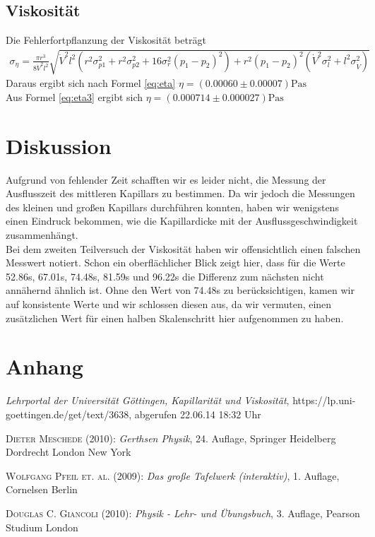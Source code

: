 \documentclass[12pt,a4paper,titlepage,headinclude,bibtotoc]{scrartcl}
\begin{document}
\subsection{Viskosität}
\begin{figure}
\centering

\end{figure}
Die Fehlerfortpflanzung der Viskosität beträgt
\begin{align*}
\sigma_{\eta}=\frac{\pi r^{3}}{8  \dot{V}^{2} l^{2}} \sqrt{\dot{V}^{2} l^{2} \left(r^{2}  \sigma_{p1}^{2} + r^{2} \sigma_{p2}^{2} + 16  \sigma_{r}^{2} \left(p_{1} - p_{2}\right)^{2}\right) + r^{2}\left(p_{1} - p_{2}\right)^{2}\left(\dot{V}^{2}  \sigma_{l}^{2}  + l^{2} \sigma_{\dot{V}}^{2}\right)}
\end{align*}
Daraus ergibt sich nach Formel \eqref{eq:eta} $\eta=(0.00060 \pm 0.00007)\si{\Pa\s}$\\
Aus Formel \eqref{eq:eta3} ergibt sich $\eta=(0.000714 \pm 0.000027)\si{\Pa\s} $

\section{Diskussion}
\label{sec:diskussion}
Aufgrund von fehlender Zeit schafften wir es leider nicht, die Messung der Ausflusszeit des mittleren Kapillars zu bestimmen.
Da wir jedoch die Messungen des kleinen und großen Kapillars durchführen konnten, haben wir wenigstens einen Eindruck bekommen, wie die Kapillardicke mit der Ausflussgeschwindigkeit zusammenhängt.\\
Bei dem zweiten Teilversuch der Viskosität haben wir offensichtlich einen falschen Messwert notiert.
Schon ein oberflächlicher Blick zeigt hier, dass für die Werte 52.86s, 67.01s, 74.48s, 81.59s und 96.22s die Differenz zum nächsten nicht annähernd ähnlich ist.
Ohne den Wert von 74.48s zu berücksichtigen, kamen wir auf konsistente Werte und wir schlossen diesen aus, da wir vermuten, einen zusätzlichen Wert für einen halben Skalenschritt hier aufgenommen zu haben.


\section{Anhang}
\begin{thebibliography}{9}

	\emph{Lehrportal der Universität Göttingen, Kapillarität und Viskosität},
  https://lp.uni-goettingen.de/get/text/3638, abgerufen 22.06.14 18:32 Uhr

	\textsc{Dieter Meschede} (2010): \emph{Gerthsen Physik}, 24. Auflage, Springer Heidelberg
Dordrecht London New York

	\textsc{Wolfgang Pfeil et. al.} (2009): \emph{Das große Tafelwerk (interaktiv)}, 1. Auflage, Cornelsen Berlin

	\textsc{Douglas C. Giancoli} (2010): \emph{Physik - Lehr- und Übungsbuch}, 3. Auflage, Pearson Studium London
\end{thebibliography}
\end{document}
